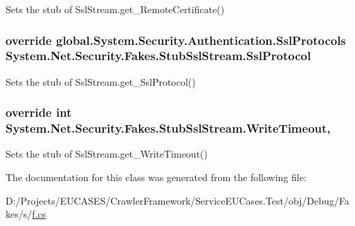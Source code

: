 Sets the stub of Ssl\-Stream.\-get\-\_\-\-Remote\-Certificate()

\hypertarget{class_system_1_1_net_1_1_security_1_1_fakes_1_1_stub_ssl_stream_a22e61f7a1c710097884036ba8641bb45}{
\subsubsection[{Ssl\-Protocol}]{\setlength{\rightskip}{0pt plus 5cm}override global.\-System.\-Security.\-Authentication.\-Ssl\-Protocols System.\-Net.\-Security.\-Fakes.\-Stub\-Ssl\-Stream.\-Ssl\-Protocol\hspace{0.3cm}{\ttfamily [get]}}}\label{class_system_1_1_net_1_1_security_1_1_fakes_1_1_stub_ssl_stream_a22e61f7a1c710097884036ba8641bb45}


Sets the stub of Ssl\-Stream.\-get\-\_\-\-Ssl\-Protocol()

\hypertarget{class_system_1_1_net_1_1_security_1_1_fakes_1_1_stub_ssl_stream_a74580e3ff628c9e673fb05ea33f8dea9}{
\subsubsection[{Write\-Timeout}]{\setlength{\rightskip}{0pt plus 5cm}override int System.\-Net.\-Security.\-Fakes.\-Stub\-Ssl\-Stream.\-Write\-Timeout\hspace{0.3cm}{\ttfamily [get]}, {\ttfamily [set]}}}\label{class_system_1_1_net_1_1_security_1_1_fakes_1_1_stub_ssl_stream_a74580e3ff628c9e673fb05ea33f8dea9}


Sets the stub of Ssl\-Stream.\-get\-\_\-\-Write\-Timeout()



The documentation for this class was generated from the following file\-:\begin{DoxyCompactItemize}
\item 
D\-:/\-Projects/\-E\-U\-C\-A\-S\-E\-S/\-Crawler\-Framework/\-Service\-E\-U\-Cases.\-Test/obj/\-Debug/\-Fakes/s/\hyperlink{s_2f_8cs}{f.\-cs}\end{DoxyCompactItemize}
